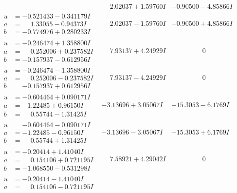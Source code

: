 \documentclass[1p]{elsarticle_modified}
\theoremstyle{definition}
\begin{document}
$$\begin{array}{c|c|c}
 & \phantom{-}2.02037 + 1.59760 I & -0.90500 - 4.85866 I \\ \hline\begin{aligned}
u &= -0.521433 - 0.341179 I \\
a &= \phantom{-}1.33055 - 0.94373 I \\
b &= -0.774976 + 0.280233 I\end{aligned}
 & \phantom{-}2.02037 - 1.59760 I & -0.90500 + 4.85866 I \\ \hline\begin{aligned}
u &= -0.246474 + 1.358800 I \\
a &= \phantom{-}0.252006 + 0.237582 I \\
b &= -0.157937 - 0.612956 I\end{aligned}
 & \phantom{-}7.93137 + 4.24929 I & \phantom{-0.000000 } 0 \\ \hline\begin{aligned}
u &= -0.246474 - 1.358800 I \\
a &= \phantom{-}0.252006 - 0.237582 I \\
b &= -0.157937 + 0.612956 I\end{aligned}
 & \phantom{-}7.93137 - 4.24929 I & \phantom{-0.000000 } 0 \\ \hline\begin{aligned}
u &= -0.604464 + 0.090171 I \\
a &= -1.22485 + 0.96150 I \\
b &= \phantom{-}0.55744 - 1.31425 I\end{aligned}
 & -3.13696 + 3.05067 I & -15.3053 - 6.1769 I \\ \hline\begin{aligned}
u &= -0.604464 - 0.090171 I \\
a &= -1.22485 - 0.96150 I \\
b &= \phantom{-}0.55744 + 1.31425 I\end{aligned}
 & -3.13696 - 3.05067 I & -15.3053 + 6.1769 I \\ \hline\begin{aligned}
u &= -0.20414 + 1.41040 I \\
a &= \phantom{-}0.154106 + 0.721195 I \\
b &= -1.068550 - 0.531298 I\end{aligned}
 & \phantom{-}7.58921 + 4.29042 I & \phantom{-0.000000 } 0 \\ \hline\begin{aligned}
u &= -0.20414 - 1.41040 I \\
a &= \phantom{-}0.154106 - 0.721195 I \\

\end{aligned}
\end{array}$$
\end{document}
